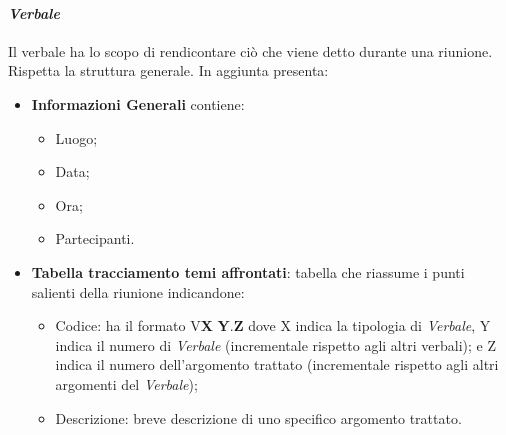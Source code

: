 \paragraph{\textit{Verbale}}
Il verbale ha lo scopo di rendicontare ciò che viene detto durante una riunione.
Rispetta la struttura generale.
In aggiunta presenta:
\begin{itemize} 
    \item \textbf{Informazioni Generali}
    contiene:
    \begin{itemize} 
        \item Luogo;
        \item Data;
        \item Ora;
        \item Partecipanti.
    \end{itemize}
\item \textbf{Tabella tracciamento temi affrontati}:
tabella che riassume i punti salienti della riunione indicandone:
    \begin{itemize} 
        \item Codice: ha il formato V\textbf{X} \textbf{Y}.\textbf{Z} dove X indica la tipologia di \textit{Verbale}, Y indica il numero di \textit{Verbale} (incrementale rispetto agli altri verbali);
        e Z indica il numero dell'argomento trattato (incrementale rispetto agli altri argomenti del \textit{Verbale});
        \item Descrizione: breve descrizione di uno specifico argomento trattato.
    \end{itemize}
\end{itemize}